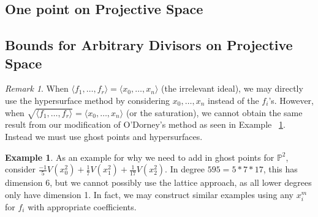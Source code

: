 \documentclass{amsart}
\theoremstyle{plain}
\theoremstyle{definition}
\newtheorem{example}[thm]{Example}
\theoremstyle{remark}
\newtheorem{rem}[thm]{Remark}
\numberwithin{equation}{section}
\newcommand\ssec{\subsection}
\newcommand\bp{{\mathbb P}}
\begin{document}
\ssec{One point on Projective Space}



\ssec{Bounds for Arbitrary Divisors on Projective Space}



\begin{rem}
When $\langle f_1, \ldots, f_r \rangle = \langle x_0, \ldots, x_n \rangle$ (the irrelevant ideal), we may directly use the hypersurface method by considering $x_0, \ldots, x_n$ instead of the $f_i$'s. However, when $\sqrt{\langle f_1, \ldots, f_r \rangle} = \langle x_0, \ldots, x_n \rangle$ (or the saturation), we cannot obtain the same result from our modification of O'Dorney's method as seen in Example ~\ref{eg:radical}. Instead we must use ghost points and hypersurfaces.
\end{rem}

\begin{example}
\label{eg:radical}
As an example for why we need to add in ghost points for $\bp^2$, consider $\frac{-1}{5}V(x_0^2) + \frac{1}{7}V(x_1^2) + \frac{1}{17}V(x_2^2)$. In degree $595 = 5* 7 * 17$, this has dimension $6$, but we cannot possibly use the lattice approach, as all lower degrees only have dimension 1. In fact, we may construct similar examples using any $x_i^m$ for $f_i$ with appropriate coefficients.
\end{example}
\end{document}
